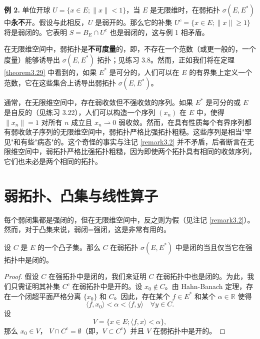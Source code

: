 \textbf{例 2.} 单位开球 $U = \{x \in E; \|x\| < 1\}$，当 $E$ 是无限维时，在弱拓扑 $\sigma(E, E^*)$ 中\textbf{永不}开。假设与此相反，$U$ 是弱开的。那么它的补集 $U^c = \{x \in E; \|x\| \ge 1\}$ 将是弱闭的。它表明 $S = B_E \cap U^c$ 也是弱闭的，这与例 1 相矛盾。

\begin{remark}\label{remark3.3}
在无限维空间中，弱拓扑是\textbf{不可度量}的，即，不存在一个范数（或更一般的，一个度量）能够诱导出 $\sigma(E, E^*)$ 拓扑；见练习 3.8。然而，正如我们将在定理 \ref{theorem3.29} 中看到的，如果 $E^*$ 是可分的，人们可以在 $E$ 的有界集上定义一个范数，它在这些集合上诱导出弱拓扑 $\sigma(E, E^*)$。
\end{remark}

\begin{remark}\label{remark3.4}
通常，在无限维空间中，存在弱收敛但不强收敛的序列。如果 $E^*$ 是可分的或 $E$ 是自反的（见练习 3.22），人们可以构造一个序列 $(x_n)$ 在 $E$ 中，使得 $\|x_n\| = 1$ 对所有 $n$ 成立且 $x_n \rightharpoonup 0$ 弱收敛。然而，在具有性质每个有界序列都有弱收敛子序列的无限维空间中，弱拓扑严格比强拓扑粗糙。这些序列是相当"罕见"和有些"病态"的。这个奇怪的事实与注记 \ref{remark3.2} 并不矛盾，后者断言在无限维空间中，弱拓扑严格比强拓扑粗糙，因为即使两个拓扑具有相同的收敛序列，它们也未必是两个相同的拓扑。
\end{remark}

\section{弱拓扑、凸集与线性算子}

每个弱闭集都是强闭的，但在无限维空间中，反之则为假（见注记 \ref{remark3.2}）。然而，对于凸集来说，弱闭=强闭，这是非常有用的。

\begin{theorem}\label{theorem3.7}
设 $C$ 是 $E$ 的一个凸子集。那么 $C$ 在弱拓扑 $\sigma(E, E^*)$ 中是闭的当且仅当它在强拓扑中是闭的。
\end{theorem}

\begin{proof}
假设 $C$ 在强拓扑中是闭的，我们来证明 $C$ 在弱拓扑中也是闭的。为此，我们只需证明其补集 $C^c$ 在弱拓扑中是开的。设 $x_0 \notin C$。由 Hahn-Banach 定理，存在一个闭超平面严格分离 $\{x_0\}$ 和 $C$。因此，存在某个 $f \in E^*$ 和某个 $\alpha \in \mathbb{R}$ 使得
\[ \langle f, x_0 \rangle < \alpha < \langle f, y \rangle \quad \forall y \in C. \]
设
\[ V = \{x \in E; \langle f, x \rangle < \alpha \}, \]
那么 $x_0 \in V$， $V \cap C^c = \emptyset$（即，$V \subset C^c$）并且 $V$ 在弱拓扑中是开的。
\end{proof}

